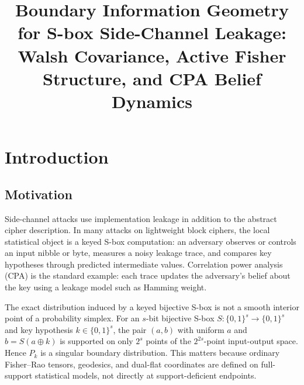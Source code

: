 \documentclass[referee,lineno,pdflatex,sn-mathphys-num]{sn-jnl}
\title[Boundary Information Geometry for S-box Side-Channel Leakage]{
Boundary Information Geometry for S-box Side-Channel Leakage:
Walsh Covariance, Active Fisher Structure, and CPA Belief Dynamics}
\theoremstyle{thmstylethree}
\theoremstyle{thmstyletwo}
\theoremstyle{thmstyleone}
\begin{document}
\maketitle
\doublespacing


\section{Introduction}\label{sec:intro}

\subsection{Motivation}

Side-channel attacks use implementation leakage in addition to the abstract
cipher description.  In many attacks on lightweight block ciphers, the
local statistical object is a keyed S-box computation: an adversary observes or
controls an input nibble or byte, measures a noisy leakage trace, and compares
key hypotheses through predicted intermediate values.  Correlation power
analysis (CPA) is the standard example: each trace updates the adversary's
belief about the key using a leakage model such as Hamming weight.

The exact distribution induced by a keyed bijective S-box is not a smooth
interior point of a probability simplex.  For an $s$-bit bijective S-box
$S:\{0,1\}^s\to\{0,1\}^s$ and key hypothesis $k\in\{0,1\}^s$, the pair
$(a,b)$ with uniform $a$ and $b=S(a\oplus k)$ is supported on only $2^s$ points
of the $2^{2s}$-point input-output space.  Hence $P_k$ is a singular boundary
distribution.  This matters because ordinary Fisher--Rao tensors, geodesics,
and dual-flat coordinates are defined on full-support statistical models, not
directly at support-deficient endpoints.
\end{document}
